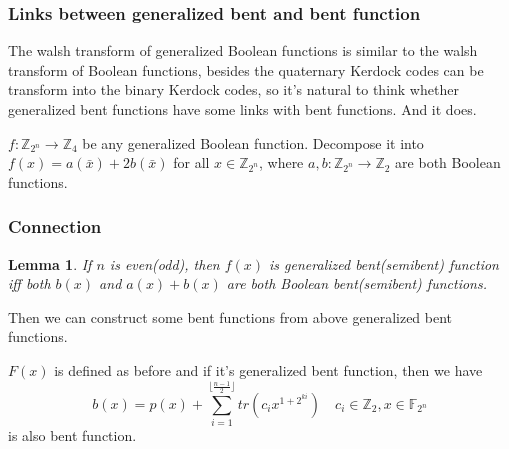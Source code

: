\documentclass[
    aspectratio=169,                   %
]{beamer}
\renewcommand{\Bbb}{\mathbb}
\newcommand{\Z}{\mathbb{Z}}
\newtheorem{lem}[thm]{Lemma}
\begin{document}
    \begin{frame}
        \frametitle{Links between generalized bent  and bent function}
    
        The walsh transform of generalized Boolean functions is similar to the walsh transform of Boolean functions, besides the quaternary Kerdock codes can be transform into the binary Kerdock codes, so it's natural to think whether generalized bent functions have some links with bent functions. And it does.

    $ f:\Z_{2^{n}}\rightarrow\Z_4 $ be any generalized Boolean function. Decompose it into $ f(x)=a(\bar{x})+2b(\bar{x}) $ for all $ x\in\Z_{2^n} $, where $ a,b:\Z_{2^{n}}\rightarrow\Z_2 $ are both Boolean functions.
    
    \end{frame}
    \begin{frame}
        \frametitle{Connection}
    
        \begin{lem}
            If $ n $ is even(odd), then $ f(x) $ is generalized bent(semibent) function iff both $ b(x) $ and $ a(x)+b(x) $ are both Boolean bent(semibent) functions.
        \end{lem}
        Then we can construct some bent functions from above generalized bent functions.
        \begin{example}
            $ F(x) $ is defined as before and if it's generalized bent function, then we have 
            \[ b(x)=p(x)+\sum_{i=1}^{\lfloor\frac{n-1}{2}\rfloor}tr(c_ix^{1+2^{ki}}) \quad c_i\in\Z_2,x\in\Bbb F_{2^n} \]
            is also bent function.
        \end{example}
    \end{frame}



    \makebottom     %
\end{document}

